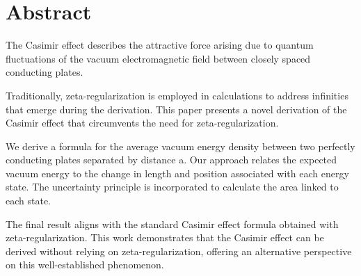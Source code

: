 \section{Abstract}
\par
The Casimir effect describes the attractive force arising due to quantum fluctuations of the vacuum electromagnetic field 
between closely spaced conducting plates. 

Traditionally, zeta-regularization is employed in calculations to address infinities that emerge during the derivation. 
This paper presents a novel derivation of the Casimir effect that circumvents the need for zeta-regularization.

We derive a formula for the average vacuum energy density between two perfectly conducting plates separated by distance a. 
Our approach relates the expected vacuum energy to the change in length and position associated with each energy state. 
The uncertainty principle is incorporated to calculate the area linked to each state. 

The final result aligns with the standard Casimir effect formula obtained with zeta-regularization. 
This work demonstrates that the Casimir effect can be derived without relying on zeta-regularization, 
offering an alternative perspective on this well-established phenomenon.
